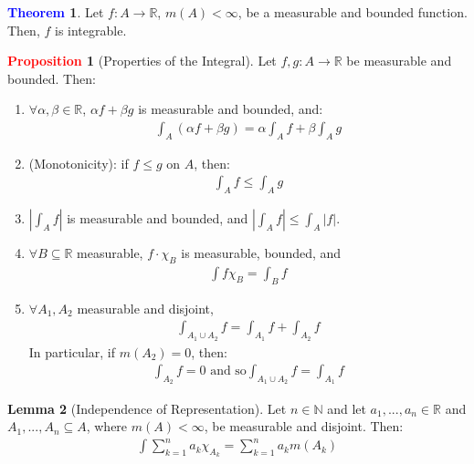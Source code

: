 \documentclass[reqno,11pt]{amsart}
\theoremstyle{definition}
\newcommand{\bb}[1]{\mathbb{#1}}
\newtheorem{theorem}{\textcolor{blue}{Theorem}}
\newtheorem{lemma}[theorem]{Lemma}
\theoremstyle{definition}
\newtheorem{prop}{\textcolor{red}{Proposition}}
\theoremstyle{remark}
\begin{document}
\begin{theorem}
	Let $f: A \rightarrow \bb{R}$, $m(A) < \infty$, be a measurable and bounded function. Then, $f$ is integrable. 
\end{theorem}
\begin{prop}[Properties of the Integral] 
	Let $f, g: A \rightarrow \bb{R}$ be measurable and bounded. Then: 
	\begin{enumerate}[noitemsep]
		\item $\forall \alpha, \beta \in \bb{R}$, $\alpha f + \beta g$ is measurable and bounded, and: 
		\begin{align*}	
			\int_A \left( 	\alpha f + \beta g		\right) 	= \alpha \int_A f + \beta \int_A g 
		\end{align*}
		\item (Monotonicity): if $f \leq g$ on $A$, then: 
		\begin{align*}
			\int_A f \leq \int_A g	
		\end{align*}
	\item $| \int_A f|$ is measurable and bounded, and $| \int_A f | \leq \int_A |f|$. 
	\item $\forall B \subseteq \bb{R}$ measurable, $f \cdot \chi_B$ is measurable, bounded, and 
	\begin{align*}
		\int f \chi_B = \int_B f 	
	\end{align*}
	\item $\forall A_1, A_2$ measurable and disjoint, 
	\begin{align*}
		\int_{A_1 \cup A_2} f = \int_{A_1} f + \int_{A_2} f 	
	\end{align*}
	In particular, if $m(A_2) = 0$, then: 
	\begin{align*}
		\int_{A_2} f = 0 \mbox{ and so} \int_{A_1 \cup A_2}  f = \int_{A_1} f	
	\end{align*}
	\end{enumerate}
\end{prop}

\begin{lemma}[Independence of Representation] 
	Let $n \in \bb{N}$ and let $a_1, ..., a_n \in \bb{R}$ and $A_1, ..., A_n \subseteq A$, where $m(A) < \infty$, be measurable and disjoint. Then: 
	\begin{align*}
		\int \sum_{k=1}^n a_k \chi_{A_k} = \sum_{k=1}^n a_k m(A_k) 	
	\end{align*}

\end{lemma}
\end{document}
